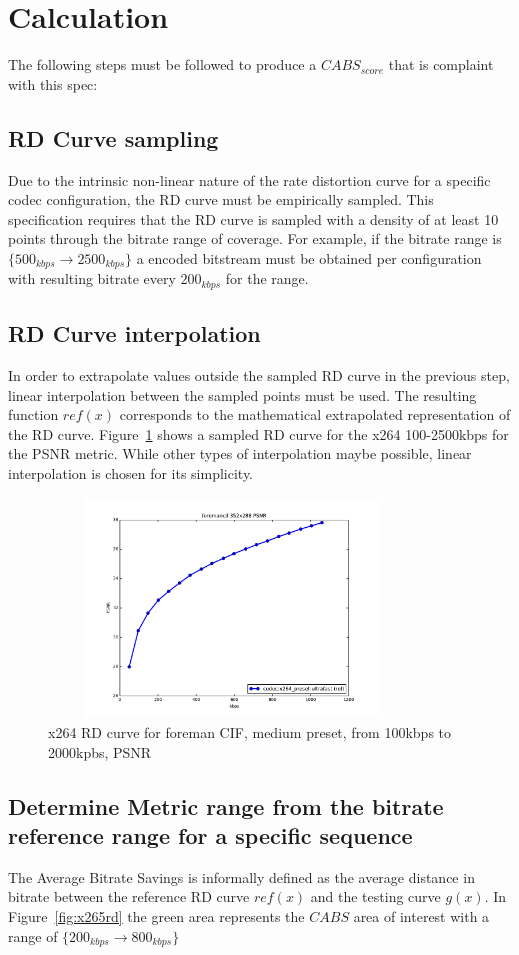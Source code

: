\documentclass[12pt, conference, hidelinks, onecolumn]{IEEEtran}
\begin{document}
\section{Calculation}
The following steps must be followed to produce a $CABS_{score}$ that is complaint with this spec:
\subsection{RD Curve sampling}
Due to the intrinsic non-linear nature of the rate distortion curve for a specific codec configuration, the RD curve must be empirically sampled. This specification requires that the RD curve is sampled with a density of at least 10 points through the bitrate range of coverage. For example, if the bitrate range is $\lbrace 500_{kbps} \to 2500_{kbps} \rbrace $ a encoded bitstream must be obtained per configuration with resulting bitrate every $200_{kbps}$ for the range.


\subsection{RD Curve interpolation}
In order to extrapolate values outside the sampled RD curve in the previous step, linear interpolation between the sampled points must be used. The resulting function $ref(x)$ corresponds to the mathematical extrapolated representation of the RD curve. Figure~\ref{fig:x264rd} shows a sampled RD curve for the x264 100-2500kbps for the PSNR metric. While other types of interpolation maybe possible, linear interpolation is chosen for its simplicity.

\begin{figure}[!ht]
\centering
\includegraphics[width=3.8in,height=2.3in]{x264_rd}
\caption{x264 RD curve for foreman CIF, medium preset, from 100kbps to 2000kpbs, PSNR}
\label{fig:x264rd}
\end{figure}

\subsection{Determine Metric range from the bitrate reference range for a specific sequence}
The Average Bitrate Savings is informally defined as the average distance in bitrate between the reference RD curve $ref(x)$ and the testing curve $g(x)$. In Figure~\ref{fig:x265rd} the green area represents the $CABS$ area of interest with a range of $\lbrace 200_{kbps} \to 800_{kbps} \rbrace$
\end{document}
